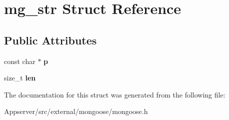 \hypertarget{structmg__str}{}\section{mg\+\_\+str Struct Reference}
\label{structmg__str}
\subsection*{Public Attributes}
\begin{DoxyCompactItemize}
\item 
const char $\ast$ {\bfseries p}\hypertarget{structmg__str_a1e743a766f92c904d25fe4d058017486}{}\label{structmg__str_a1e743a766f92c904d25fe4d058017486}

\item 
size\+\_\+t {\bfseries len}\hypertarget{structmg__str_a53945bdd422bf389d74b863f23cd4463}{}\label{structmg__str_a53945bdd422bf389d74b863f23cd4463}

\end{DoxyCompactItemize}


The documentation for this struct was generated from the following file\+:\begin{DoxyCompactItemize}
\item 
Appserver/src/external/mongoose/mongoose.\+h\end{DoxyCompactItemize}

